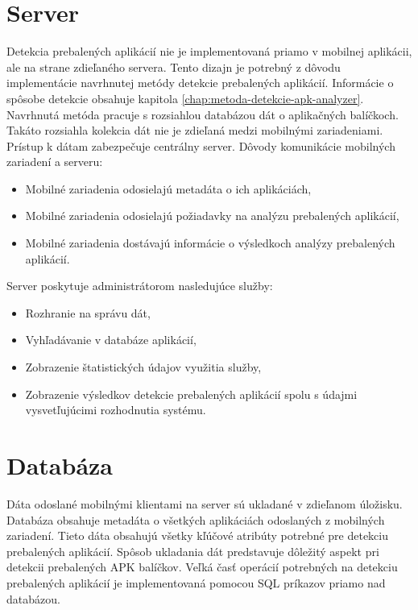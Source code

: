 \section{Server}
Detekcia prebalených aplikácií nie je implementovaná priamo v mobilnej aplikácii, ale na strane zdieľaného servera. Tento dizajn je potrebný z dôvodu implementácie navrhnutej metódy detekcie prebalených aplikácií. Informácie o spôsobe detekcie obsahuje kapitola \ref{chap:metoda-detekcie-apk-analyzer}. Navrhnutá metóda pracuje s rozsiahlou databázou dát o aplikačných balíčkoch. Takáto rozsiahla kolekcia dát nie je zdieľaná medzi mobilnými zariadeniami. Prístup k dátam zabezpečuje centrálny server. 
\newline
\noindent Dôvody komunikácie mobilných zariadení a serveru:
\begin{itemize}
	\item Mobilné zariadenia odosielajú metadáta o ich aplikáciách,
	\item Mobilné zariadenia odosielajú požiadavky na analýzu prebalených aplikácií,
	\item Mobilné zariadenia dostávajú informácie o výsledkoch analýzy prebalených aplikácií.
\end{itemize}
Server poskytuje administrátorom nasledujúce služby:
\begin{itemize}
	\item Rozhranie na správu dát,
	\item Vyhľadávanie v databáze aplikácií,
	\item Zobrazenie štatistických údajov využitia služby,
	\item Zobrazenie výsledkov detekcie prebalených aplikácií spolu s údajmi vysvetľujúcimi rozhodnutia systému.
\end{itemize}

\section{Databáza}
Dáta odoslané mobilnými klientami na server sú ukladané v zdieľanom úložisku. Databáza obsahuje metadáta o všetkých aplikáciách odoslaných z mobilných zariadení. Tieto dáta obsahujú všetky kľúčové atribúty potrebné pre detekciu prebalených aplikácií. Spôsob ukladania dát predstavuje dôležitý aspekt pri detekcii prebalených APK balíčkov. Veľká časť operácií potrebných na detekciu prebalených aplikácií je implementovaná pomocou SQL príkazov priamo nad databázou. 
